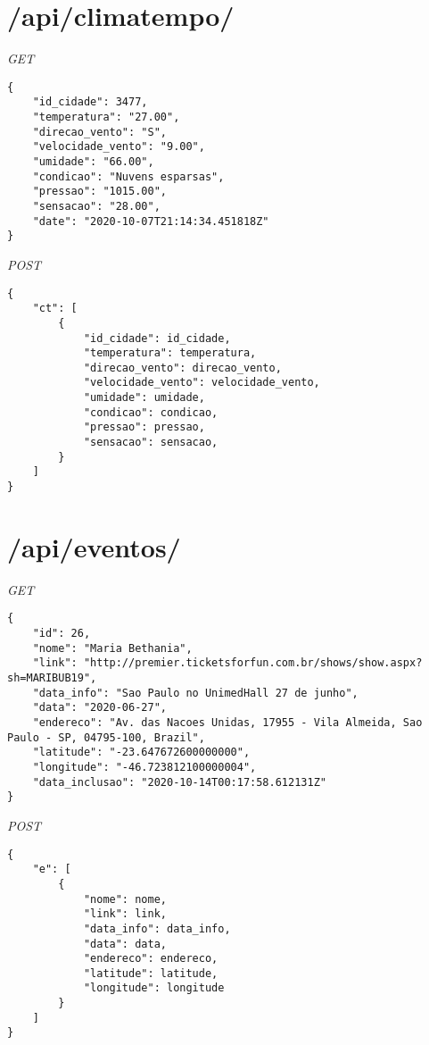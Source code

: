 \section{/api/climatempo/}
\textit{GET}
\begin{lstlisting}
{
    "id_cidade": 3477,
    "temperatura": "27.00",
    "direcao_vento": "S",
    "velocidade_vento": "9.00",
    "umidade": "66.00",
    "condicao": "Nuvens esparsas",
    "pressao": "1015.00",
    "sensacao": "28.00",
    "date": "2020-10-07T21:14:34.451818Z"
}
\end{lstlisting}
\textit{POST}
\begin{lstlisting}
{
    "ct": [
        {
            "id_cidade": id_cidade,
            "temperatura": temperatura,
            "direcao_vento": direcao_vento,
            "velocidade_vento": velocidade_vento,
            "umidade": umidade,
            "condicao": condicao,
            "pressao": pressao,
            "sensacao": sensacao,
        }
    ]
}
\end{lstlisting}
\section{/api/eventos/}
\textit{GET}
\begin{lstlisting}
{
    "id": 26,
    "nome": "Maria Bethania",
    "link": "http://premier.ticketsforfun.com.br/shows/show.aspx?sh=MARIBUB19",
    "data_info": "Sao Paulo no UnimedHall 27 de junho",
    "data": "2020-06-27",
    "endereco": "Av. das Nacoes Unidas, 17955 - Vila Almeida, Sao Paulo - SP, 04795-100, Brazil",
    "latitude": "-23.647672600000000",
    "longitude": "-46.723812100000004",
    "data_inclusao": "2020-10-14T00:17:58.612131Z"
}
\end{lstlisting}
\textit{POST}
\begin{lstlisting}
{
    "e": [
        {
            "nome": nome,
            "link": link,
            "data_info": data_info,
            "data": data,
            "endereco": endereco,
            "latitude": latitude,
            "longitude": longitude
        }
    ]
}
\end{lstlisting}
 
